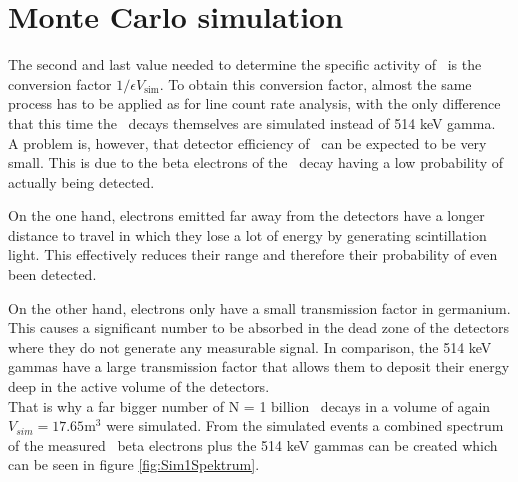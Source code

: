 \documentclass[encoding=utf8,british]{tumphthesis}
\begin{document}
\iffalse



\section{Monte Carlo simulation}
\label{sec:MonteCarlo2}

The second and last value needed to determine the specific activity of \Kr\ is the conversion factor $1/\epsilon V_{\mathrm{sim}}$.
To obtain this conversion factor, almost the same process has to be applied as for line count rate analysis, with the only difference that this time the \Kr\ decays themselves are simulated instead of 514 keV gamma.
\\

A problem is, however, that detector efficiency of \Kr\ can be expected to be very small.
This is due to the beta electrons of the \Kr\ decay having a low probability of actually being detected.

On the one hand, electrons emitted far away from the detectors have a longer distance to travel in which they lose a lot of energy by generating scintillation light.
This effectively reduces their range and therefore their probability of even been detected.

On the other hand, electrons only have a small transmission factor in germanium.
This causes a significant number to be absorbed in the dead zone of the detectors where they do not generate any measurable signal.
In comparison, the 514 keV gammas have a large transmission factor that allows them to deposit their energy deep in the active volume of the detectors.
\\



That is why a far bigger number of N = 1 billion \Kr\ decays in a volume of again $V_{sim} = 17.65 \mathrm{m}^3$ were simulated.
From the simulated events  a combined spectrum of the measured \Kr\ beta electrons plus the 514 keV gammas can be created which can be seen in figure \ref{fig:Sim1Spektrum}.
\\
\end{document}
